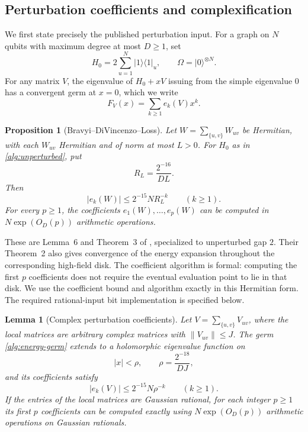 \documentclass[reqno]{amsart}
\newtheorem{proposition}[theorem]{Proposition}
\newtheorem{lemma}[theorem]{Lemma}
\theoremstyle{definition}
\theoremstyle{remark}
\begin{document}
\subsection{Perturbation coefficients and complexification}
\label{alg:perturbation-subsection}

We first state precisely the published perturbation input.
For a graph on \(N\) qubits with maximum degree at most \(D\ge1\), set
\begin{equation}
 H_0=2\sum_{u=1}^N |1\rangle\langle1|_u,
 \qquad \Omega=|0\rangle^{\otimes N}.
 \label{alg:unperturbed}
\end{equation}
For any matrix \(V\), the eigenvalue of \(H_0+xV\) issuing from the
simple eigenvalue \(0\) has a convergent germ at \(x=0\), which we write
\begin{equation}
 F_V(x)=\sum_{k\ge1}e_k(V)x^k.
 \label{alg:energy-germ}
\end{equation}

\begin{proposition}[Bravyi--DiVincenzo--Loss]
\label{alg:bdl}
Let \(W=\sum_{\{u,v\}}W_{uv}\) be Hermitian, with each
\(W_{uv}\) Hermitian and of norm at most \(L>0\).
For \(H_0\) as in \eqref{alg:unperturbed}, put
\[
 R_L=\frac{2^{-16}}{DL}.
 \]
Then
\begin{equation}
 |e_k(W)|\le2^{-15}N R_L^{-k}\qquad(k\ge1).
 \label{alg:bdl-bound}
\end{equation}
For every \(p\ge1\), the coefficients
\(e_1(W),\ldots,e_p(W)\) can be computed in
\(N\exp(O_D(p))\) arithmetic operations.
\end{proposition}

These are Lemma~6 and Theorem~3 of \cite{BDL08}, specialized to
unperturbed gap \(2\).  Their Theorem~2 also gives convergence of the
energy expansion throughout the corresponding high-field disk.
The coefficient algorithm is formal: computing the first \(p\)
coefficients does not require the eventual evaluation point to lie in
that disk.  We use the coefficient bound and algorithm exactly in this
Hermitian form.  The required rational-input bit implementation is
specified below.

\begin{lemma}[Complex perturbation coefficients]
\label{alg:complexification}
Let \(V=\sum_{\{u,v\}}V_{uv}\), where the local matrices are arbitrary
complex matrices with \(\|V_{uv}\|\le J\).
The germ \eqref{alg:energy-germ} extends to a holomorphic eigenvalue
function on
\[
 |x|<\rho,\qquad \rho=\frac{2^{-18}}{DJ},
 \]
and its coefficients satisfy
\begin{equation}
 |e_k(V)|\le2^{-15}N\rho^{-k}\qquad(k\ge1).
 \label{alg:complex-bound}
\end{equation}
If the entries of the local matrices are Gaussian rational, for each
integer \(p\ge1\) its first \(p\) coefficients can be computed exactly using
\(N\exp(O_D(p))\) arithmetic operations on Gaussian rationals.
\end{lemma}
\end{document}
